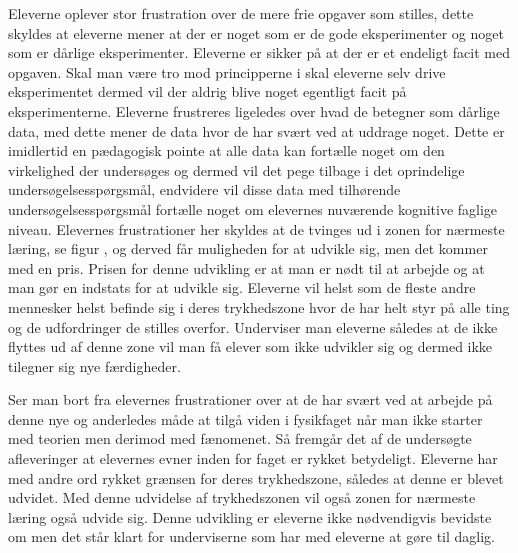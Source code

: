 Eleverne oplever stor frustration over de mere frie opgaver som stilles, dette skyldes at eleverne mener at der er noget som er de gode eksperimenter og noget som er dårlige eksperimenter. Eleverne er sikker på at der er et endeligt facit med opgaven. Skal man være tro mod principperne i \ib{} skal eleverne selv drive eksperimentet dermed vil der aldrig blive noget egentligt facit på eksperimenterne. Eleverne frustreres ligeledes over hvad de betegner som dårlige data, med dette mener de data hvor de har svært ved at uddrage noget. Dette er imidlertid en pædagogisk pointe at alle data kan fortælle noget om den virkelighed der undersøges og dermed vil det pege tilbage i det oprindelige undersøgelsesspørgsmål, endvidere vil disse data med tilhørende undersøgelsesspørgsmål fortælle noget om elevernes nuværende kognitive faglige niveau.  Elevernes frustrationer her skyldes at de tvinges ud i zonen for nærmeste læring, se figur , og derved får muligheden for at udvikle sig, men det kommer med en pris. Prisen for denne udvikling er at man er nødt til at arbejde og at man gør en indstats for at udvikle sig. Eleverne vil helst som de fleste andre mennesker helst befinde sig i deres trykhedszone hvor de har helt styr på alle ting og de udfordringer de stilles overfor. Underviser man eleverne således at de ikke flyttes ud af denne zone vil man få elever som ikke udvikler sig og dermed ikke tilegner sig nye færdigheder. 

Ser man bort fra elevernes frustrationer over at de har svært ved at arbejde på denne nye og anderledes måde at tilgå viden i fysikfaget når man ikke starter med teorien men derimod med fænomenet. Så fremgår det af de undersøgte afleveringer at elevernes evner inden for faget er rykket betydeligt. Eleverne har med andre ord rykket grænsen for deres trykhedszone, således at denne er blevet udvidet. Med denne udvidelse af trykhedszonen vil også zonen for nærmeste læring også udvide sig. Denne udvikling er eleverne ikke nødvendigvis bevidste om men det står klart for underviserne som har med eleverne at gøre til daglig.

